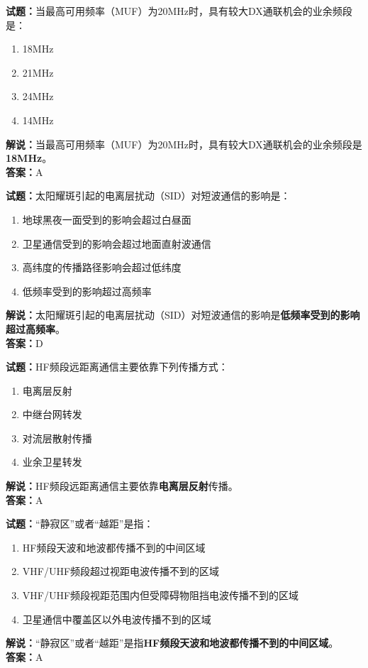 \documentclass{ctexbook}
\begin{document}
\bigskip


\noindent\textbf{试题：}当最高可用频率（MUF）为20MHz时，具有较大DX通联机会的业余频段是：
\begin{enumerate}[leftmargin=3em]
\item 18MHz
\item 21MHz
\item 24MHz
\item 14MHz
\end{enumerate}
\noindent\textbf{解说：}当最高可用频率（MUF）为20MHz时，具有较大DX通联机会的业余频段是\textbf{18MHz}。\\\noindent\textbf{答案：}A



\bigskip


\noindent\textbf{试题：}太阳耀斑引起的电离层扰动（SID）对短波通信的影响是：
\begin{enumerate}[leftmargin=3em]
\item 地球黑夜一面受到的影响会超过白昼面
\item 卫星通信受到的影响会超过地面直射波通信
\item 高纬度的传播路径影响会超过低纬度
\item 低频率受到的影响超过高频率
\end{enumerate}
\noindent\textbf{解说：}太阳耀斑引起的电离层扰动（SID）对短波通信的影响是\textbf{低频率受到的影响超过高频率}。\\\noindent\textbf{答案：}D



\bigskip


\noindent\textbf{试题：}HF频段远距离通信主要依靠下列传播方式：
\begin{enumerate}[leftmargin=3em]
\item 电离层反射
\item 中继台网转发
\item 对流层散射传播
\item 业余卫星转发
\end{enumerate}
\noindent\textbf{解说：}HF频段远距离通信主要依靠\textbf{电离层反射}传播。\\\noindent\textbf{答案：}A


\bigskip


\noindent\textbf{试题：}“静寂区”或者“越距”是指：
\begin{enumerate}[leftmargin=3em]
\item HF频段天波和地波都传播不到的中间区域
\item VHF/UHF频段超过视距电波传播不到的区域
\item VHF/UHF频段视距范围内但受障碍物阻挡电波传播不到的区域
\item 卫星通信中覆盖区以外电波传播不到的区域
\end{enumerate}
\noindent\textbf{解说：}“静寂区”或者“越距”是指\textbf{HF频段天波和地波都传播不到的中间区域}。\\\noindent\textbf{答案：}A
\end{document}
